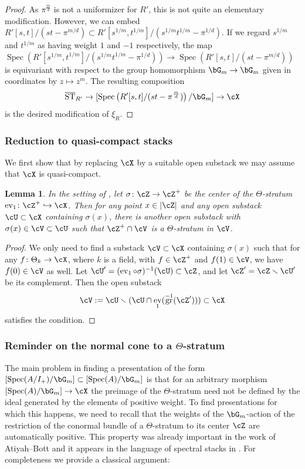 \documentclass[a4paper]{amsart}
\numberwithin{equation}{section}
\theoremstyle{plain}
\newtheorem{lem}[thm]{Lemma}
\theoremstyle{definition}
\DeclareMathOperator{\Spec}{Spec}
\DeclareMathOperator{\ST}{ST}
\DeclareMathOperator{\ev}{ev}
\newcommand{\hookarr}{\hookrightarrow}
\DeclareMathOperator{\gr}{gr}
\newcommand{\co}{\colon}
\def\oST{\overline{\ST}}
\begin{document}
\begin{proof}
As $\pi^{\frac{m}{d}}$ is not a uniformizer for $R'$, this is not quite an elementary modification. However, we can embed $R'[s,t]/(st-\pi^{m/d}) \subset R'[s^{1/m},t^{1/m}] / (s^{1/m} t^{1/m} - \pi^{1/d})$. If we regard $s^{1/m}$ and $t^{1/m}$ as having weight $1$ and $-1$ respectively, the map $\Spec(R'[s^{1/m},t^{1/m}] / (s^{1/m} t^{1/m} - \pi^{1/d})) \to \Spec(R'[s,t]/(st-\pi^{m/d}))$ is equivariant with respect to the group homomorphism $\bG_m \to \bG_m$ given in coordinates by $z\mapsto z^m$. The resulting composition
\[
\oST_{R'} \to  [\Spec \left( R^\prime[s,t]/(st-\pi^{\frac{m}{d}}) \right)/\bG_m] \to \cX
\]
is the desired modification of $\xi_{R}$.
\end{proof}	

\subsubsection{Reduction to quasi-compact stacks}

We first show that by replacing $\cX$ by a suitable open substack we may assume that $\cX$ is quasi-compact.


\begin{lem} \label{L:quasi-compact_stratum}
In the setting of , let $\sigma \co \cZ \to \cZ^+$ be the center of the $\Theta$-stratum $
\ev_1 \co \cZ^+ \hookarr \cX$. Then for any point $x \in |\cZ|$ and any open substack $\cU \subset \cX$ containing $\sigma(x)$, there is another open substack with $\sigma(x) \in \cV \subset \cU$ such that $\cZ^+ \cap \cV$ is a   $\Theta$-stratum in $\cV$.
\end{lem}
\begin{proof} We only need to find a substack $\cV \subset \cX$ containing $\sigma(x)$ such that for any $f\co \Theta_k \to \cX$, where $k$ is a field, with $f \in \cZ^+$ and $f(1) \in \cV$, we have $f(0) \in \cV$ as well.
Let $\cU' = (\ev_1 \circ \sigma)^{-1}(\cU) \subset \cZ$, and let $\cZ' = \cZ \smallsetminus \cU'$ be its complement. Then the open substack
\[
\cV:=\cU \smallsetminus (\cU \cap \ev_1(\gr^{-1}(\cZ'))) \subset \cX
\]
satisfies the condition.
\end{proof}

\subsubsection{Reminder on the normal cone to a $\Theta$-stratum}

The main problem in finding a presentation of the form $[\Spec(A/I_+)/\bG_m] \subset [\Spec(A)/\bG_m]$ is that for an arbitrary morphism $[\Spec(A)/\bG_m] \to \cX$ the preimage of the $\Theta$-stratum need not be defined by the ideal generated by the elements of positive weight. To find presentations for which this happens, we need to recall that the weights of the $\bG_m$-action of the restriction of the conormal bundle of a $\Theta$-stratum to its center $\cZ$ are automatically positive. This property was already important in the work of Atiyah--Bott \cite{AtiyahBott} and it appears in the language of spectral stacks in \cite[\S 1.2]{hlinstability}. For completeness we provide a classical argument:
\end{document}
